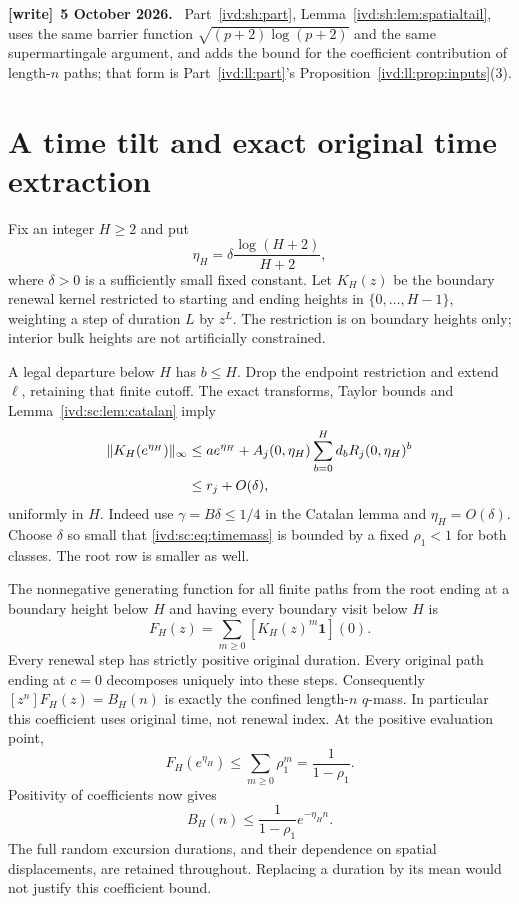 \documentclass[11pt,letterpaper]{article}
\theoremstyle{remark}\newtheorem{remark}[theorem]{Remark}
\numberwithin{equation}{section}
\newenvironment{writenote}[1][]{\par\smallskip\begingroup\small
 \noindent\textbf{[write]}\if\relax\detokenize{#1}\relax\else~\textbf{#1.}\fi\ }%
 {\par\endgroup\smallskip}
\begin{document}
\begin{writenote}[5 October 2026]
Part~\ref{ivd:sh:part}, Lemma~\ref{ivd:sh:lem:spatialtail}, uses the same barrier function $\sqrt{(p+2)\log(p+2)}$ and the same supermartingale argument, and adds the bound for the coefficient contribution of length-$n$ paths; that form is Part~\ref{ivd:ll:part}'s Proposition~\ref{ivd:ll:prop:inputs}(3).
\end{writenote}

\section{A time tilt and exact original time extraction}\label{ivd:sc:sec:timetilt}
Fix an integer $H\ge2$ and put
\begin{equation}\label{ivd:sc:eq:eta}
 \eta_H=\delta\frac{\log(H+2)}{H+2},
\end{equation}
where $\delta>0$ is a sufficiently small fixed constant. Let $K_H(z)$
be the boundary renewal kernel restricted to starting and ending heights
in $\{0,\ldots,H-1\}$, weighting a step of duration $L$ by $z^L$.
The restriction is on boundary heights only; interior bulk heights are
not artificially constrained.

A legal departure below $H$ has $b\le H$. Drop the endpoint restriction
and extend $\ell$, retaining that finite cutoff. The exact transforms,
Taylor bounds and Lemma~\ref{ivd:sc:lem:catalan} imply
\begin{align}
 \|K_H(e^{\eta_H})\|_\infty
 &\le a e^{\eta_H}
  +A_j(0,\eta_H)\sum_{b=0}^H d_b R_j(0,\eta_H)^b\notag\\
 &\le r_j+O(\delta),\label{ivd:sc:eq:timemass}
\end{align}
uniformly in $H$. Indeed use $\gamma=B\delta\le1/4$ in the
Catalan lemma and $\eta_H=O(\delta)$. Choose $\delta$ so small that
\eqref{ivd:sc:eq:timemass} is bounded by a fixed $\rho_1<1$ for both
classes. The root row is smaller as well.

The nonnegative generating function for all finite paths from the root
ending at a boundary height below $H$ and having every boundary visit
below $H$ is
\begin{equation}\label{ivd:sc:eq:FH}
 F_H(z)=\sum_{m\ge0}[K_H(z)^m\mathbf1](0).
\end{equation}
Every renewal step has strictly positive original duration. Every
original path ending at $c=0$ decomposes uniquely into these steps.
Consequently $[z^n]F_H(z)=B_H(n)$ is exactly the confined
length-$n$ $q$-mass. In particular this coefficient uses original time,
not renewal index. At the positive evaluation point,
\[
 F_H(e^{\eta_H})\le\sum_{m\ge0}\rho_1^m=\frac1{1-\rho_1}.
\]
Positivity of coefficients now gives
\begin{equation}\label{ivd:sc:eq:timebound}
 B_H(n)\le\frac1{1-\rho_1}e^{-\eta_H n}.
\end{equation}
The full random excursion durations, and their dependence on spatial
displacements, are retained throughout. Replacing a duration by its mean
would not justify this coefficient bound.
\end{document}

